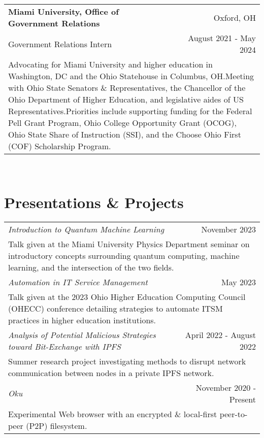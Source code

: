 \documentclass[letterpaper,8pt]{article} %
\begin{document}
{\begin{tabular*}{\linewidth}{@{\extracolsep{\fill}} lr }
\textbf{Miami University, Office of Government Relations} & \footnotesize{Oxford, OH}\\
\footnotesize{Government Relations Intern} & \footnotesize{August 2021 - May 2024}\\
\multicolumn{2}{p{\linewidth}}{\footnotesize{Advocating for Miami University and higher education in Washington, DC and the Ohio Statehouse in Columbus, OH.\@ Meeting with Ohio State Senators \& Representatives, the Chancellor of the Ohio Department of Higher Education, and legislative aides of US Representatives.\@ Priorities include supporting funding for the Federal Pell Grant Program, Ohio College Opportunity Grant (OCOG), Ohio State Share of Instruction (SSI), and the Choose Ohio First (COF) Scholarship Program.}}\\


\end{tabular*}}\\


\section{Presentations \& Projects}

\begin{tabular*}{\linewidth}{@{\extracolsep{\fill}} lr }
\emph{Introduction to Quantum Machine Learning} & November 2023\\
\multicolumn{2}{p{\linewidth}}{Talk given at the Miami University Physics Department seminar on introductory concepts surrounding quantum computing, machine learning, and the intersection of the two fields.}\\
\emph{Automation in IT Service Management} & May 2023\\
\multicolumn{2}{p{\linewidth}}{Talk given at the 2023 Ohio Higher Education Computing Council (OHECC) conference detailing strategies to automate ITSM practices in higher education institutions.}\\
\emph{Analysis of Potential Malicious Strategies toward Bit-Exchange with IPFS} & April 2022 - August 2022\\
\multicolumn{2}{p{\linewidth}}{Summer research project investigating methods to disrupt network communication between nodes in a private IPFS network.}\\
\emph{Oku} & November 2020 - Present\\
\multicolumn{2}{p{\linewidth}}{Experimental Web browser with an encrypted \& local-first peer-to-peer (P2P) filesystem.}\\
\end{tabular*}
\end{document}
